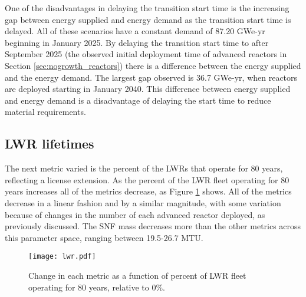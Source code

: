One of the disadvantages in delaying the transition start time is the 
increasing gap between energy supplied and energy demand as the transition 
start time is delayed. All of these scenarios have a constant demand 
of 87.20 GWe-yr beginning in January 2025. By delaying the transition start 
time to after September 2025 (the observed initial deployment time of advanced 
reactors in Section \ref{sec:nogrowth_reactors}) there is a difference
between the energy supplied and the energy demand. The largest gap observed 
is 36.7
GWe-yr, when reactors are deployed starting in January 2040. This difference 
between energy supplied and energy demand is a disadvantage of delaying 
the start time to reduce material requirements. 

\subsection{LWR lifetimes}
The next metric varied is the percent of the \glspl{LWR} that operate for 
80 years, reflecting a license extension. As the percent of the \gls{LWR} 
fleet operating for 80 years increases all of the metrics decrease, as 
Figure \ref{fig:lwr_scenario7} shows. All of the metrics decrease 
in a linear fashion and by a similar magnitude, with some variation because 
of changes in the number of each advanced reactor deployed, as previously
discussed. The \gls{SNF} mass decreases more than the other metrics across 
this parameter space, ranging between 19.5-26.7 MTU.

\begin{figure}
    \centering
    \texttt{[image: lwr.pdf]}
    \caption{Change in each metric as a function of percent of LWR fleet  
    operating for 80 years, relative to 0\%.}
    \label{fig:lwr_scenario7}
\end{figure}

